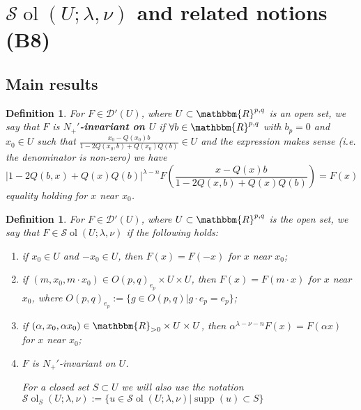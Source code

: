 \documentclass{article}
\newcommand{\assign}{:=}
\newcommand{\tmop}[1]{\ensuremath{\operatorname{#1}}}
\newcommand{\tmtextbf}[1]{{\bfseries{#1}}}
\newtheorem{definition}[proposition]{Definition}
\theoremstyle{remark}
\newcommand{\D}{\mathcal{D}}
\begin{document}
\section{$\mathcal{S} \tmop{ol} (U ; \lambda, \nu)$ and related notions (B8)}\label{sec:sol}


\subsection{Main results}

\begin{definition}
  \label{def-n-nots:def-n+invar}For $F \in \D' (U)$, where $U \subset
  \mathbbm{R}^{p, q}$ is an open set, we say that $F$ is
  \tmtextbf{$N_+'$-invariant on $U$} if $\forall b \in \mathbbm{R}^{p, q}$
  with $b_p = 0$ and $x_0 \in U$ such that $\frac{x_0 - Q (x_0) b}{1 - 2 Q
  (x_0, b) + Q (x_0) Q (b)} \in U$ and the expression makes sense (i.e. the
  denominator is non-zero) we have
  \begin{equation}
    \label{eq-Nequiv} | 1 - 2 Q (b, x) + Q (x) Q (b) |^{\lambda - n} F \left(
    \frac{x - Q (x) b}{1 - 2 Q (x, b) + Q (x) Q (b)} \right) = F (x)
  \end{equation}
  equality holding for $x$ near $x_0$.
\end{definition}

\begin{definition}
  \label{sol:def-sol}For $F \in \D' (U)$, where $U \subset \mathbbm{R}^{p, q}$
  is the open set, we say that $F \in \mathcal{S} \tmop{ol} (U ; \lambda,
  \nu)$ if the following holds:
  \begin{enumerate}
    \item if $x_0 \in U$ and $- x_0 \in U$, then $F (x) = F (- x)$ for $x$
    near $x_0$;
    
    \item if $(m, x_0, m \cdot x_0) \in O (p, q)_{e_p} \times U \times U$,
    then $F (x) = F (m \cdot x)$ for $x$ near $x_0$, where $O (p, q)_{e_p}
    \assign \{g \in O (p, q) |g \cdot e_p = e_p \}$;
    
    \item if $(\alpha, x_0, \alpha x_0) \in \mathbbm{R}_{> 0} \times U \times
    U$, then $\alpha^{\lambda - \nu - n} F (x) = F (\alpha x)$ for $x$ near
    $x_0$;
    
    \item $F$ is $N_+'$-invariant on $U$.{
    
    }{
    
    }For a closed set $S \subset U$ we will also use the notation $\mathcal{S}
    \tmop{ol}_S (U ; \lambda, \nu) \assign \{ u \in \mathcal{S} \tmop{ol} (U ;
    \lambda, \nu) | \tmop{supp} (u) \subset S \}$
  \end{enumerate}
\end{definition}
\end{document}
